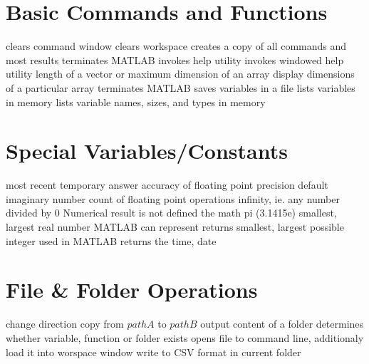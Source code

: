 
\def\content{\uppercase{MatLab}}
\def\shortcontent{\content}
\def\versionnumber{0.1}  %
\def\version{v\versionnumber\ \month\ \year}


\mytitle

\shortintro

\section{Basic Commands and Functions}{}
	{clears command window}
	{clears workspace}
	{creates a copy of all commands and most results}
	{terminates MATLAB}
	{invokes help utility}
	{invokes windowed help utility}
	{length of a vector or maximum dimension of an array}
	{display dimensions of a particular array}
	{terminates MATLAB}
	{saves variables in a file}
	{lists  variables in memory}
	{lists  variable names, sizes, and types in memory}

\section{Special Variables/Constants}{}
	{most recent temporary answer}
	{accuracy of floating point precision}
	{default}
	{imaginary number}
	{count of floating point operations}
	{infinity, ie. any number divided by 0}
	{Numerical result is not defined}
	{the math pi (3.1415e)}
	{smallest, largest real number MATLAB can represent}
	{returns smallest, largest possible integer used in MATLAB}
	{returns the time, date}

\section{File \& Folder Operations}{}
	{change direction}
	{copy from $pathA$ to $pathB$}
	{output content of a folder}
	{determines whether variable, function or folder exists}
	{opens file to command
    line, additionaly load it into worspace window}
	{write to CSV format in current folder}

